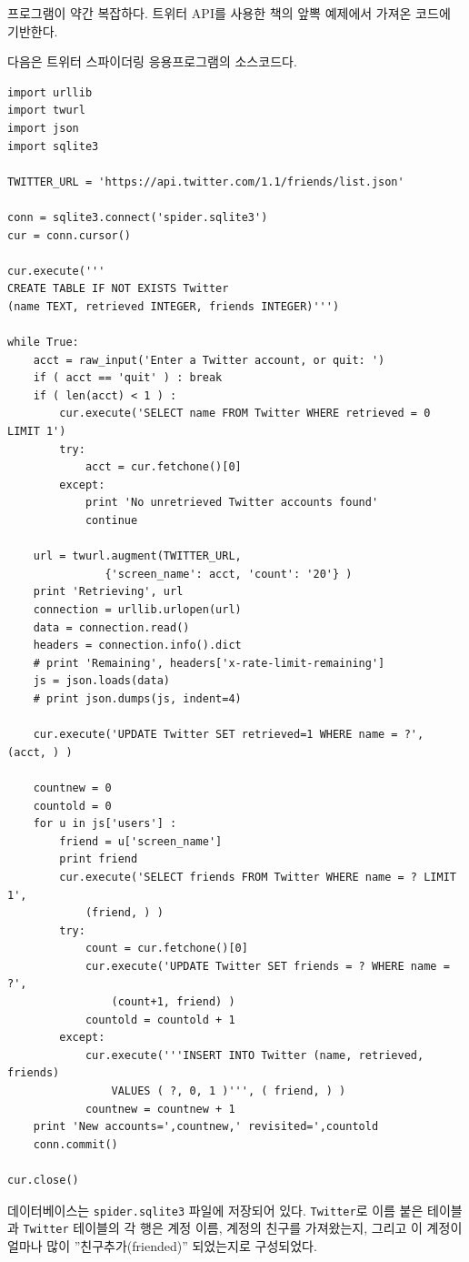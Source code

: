 프로그램이 약간 복잡하다. 트위터 API를 사용한 책의 앞뽁 예제에서 가져온 코드에 기반한다.

다음은 트위터 스파이더링 응용프로그램의 소스코드다.

\beforeverb
\begin{verbatim}
import urllib
import twurl
import json
import sqlite3

TWITTER_URL = 'https://api.twitter.com/1.1/friends/list.json'

conn = sqlite3.connect('spider.sqlite3')
cur = conn.cursor()

cur.execute('''
CREATE TABLE IF NOT EXISTS Twitter 
(name TEXT, retrieved INTEGER, friends INTEGER)''')

while True:
    acct = raw_input('Enter a Twitter account, or quit: ')
    if ( acct == 'quit' ) : break
    if ( len(acct) < 1 ) :
        cur.execute('SELECT name FROM Twitter WHERE retrieved = 0 LIMIT 1')
        try:
            acct = cur.fetchone()[0]
        except:
            print 'No unretrieved Twitter accounts found'
            continue

    url = twurl.augment(TWITTER_URL, 
               {'screen_name': acct, 'count': '20'} )
    print 'Retrieving', url
    connection = urllib.urlopen(url)
    data = connection.read()
    headers = connection.info().dict
    # print 'Remaining', headers['x-rate-limit-remaining']
    js = json.loads(data)
    # print json.dumps(js, indent=4)

    cur.execute('UPDATE Twitter SET retrieved=1 WHERE name = ?', (acct, ) )

    countnew = 0
    countold = 0
    for u in js['users'] :
        friend = u['screen_name']
        print friend
        cur.execute('SELECT friends FROM Twitter WHERE name = ? LIMIT 1', 
            (friend, ) )
        try:
            count = cur.fetchone()[0]
            cur.execute('UPDATE Twitter SET friends = ? WHERE name = ?', 
                (count+1, friend) )
            countold = countold + 1
        except:
            cur.execute('''INSERT INTO Twitter (name, retrieved, friends) 
                VALUES ( ?, 0, 1 )''', ( friend, ) )
            countnew = countnew + 1
    print 'New accounts=',countnew,' revisited=',countold
    conn.commit()

cur.close()
\end{verbatim}
\afterverb
%

데이터베이스는  {\tt spider.sqlite3} 파일에 저장되어 있다. 
{\tt Twitter}로 이름 붙은 테이블과 {\tt Twitter} 테이블의 각 행은 계정 이름,
계정의 친구를 가져왔는지, 그리고 이 계정이 얼마나 많이 ''친구추가(friended)'' 되었는지로 구성되었다.

